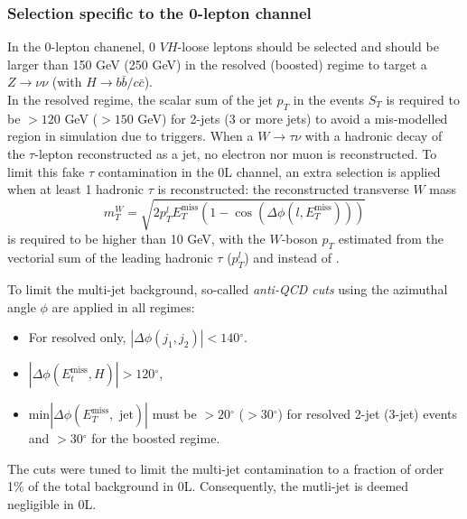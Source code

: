 \subsubsection{Selection specific to the 0-lepton channel}\label{subsubsec-0Lsel}
In the 0-lepton chanenel, 0 $VH$-loose leptons should be selected and \etm should be larger than 150 GeV (250 GeV) in the resolved (boosted) regime to target a $Z \rightarrow \nu\nu$ (with $H \rightarrow b\bar{b}/c\bar{c}$). \\ %

In the resolved regime, the scalar sum of the jet $p_T$ in the events $S_T$ is required to be $> 120$ GeV ($> 150$ GeV) for 2-jets (3 or more jets) to avoid a mis-modelled region in simulation due to triggers. When a $W \rightarrow \tau \nu$ with a hadronic decay of the $\tau$-lepton reconstructed as a jet, no electron nor muon is reconstructed. To limit this fake $\tau$ contamination in the 0L channel, an extra selection is applied when at least 1 hadronic $\tau$ is reconstructed: the reconstructed transverse $W$ mass \[ m_T^W = \sqrt{2 p_T^l E_T^{\textrm{miss}} (1 - \cos(\Delta \phi(l, E_T^{\textrm{miss}} ) ) ) } \] is required to be higher than 10 GeV, with the $W$-boson $p_T$ estimated from the vectorial sum of the leading hadronic $\tau$ ($p_T^l$) and \etm instead of \ptv.

To limit the multi-jet background, so-called \textit{anti-QCD cuts} using the azimuthal angle $\phi$ are applied in all regimes:
\begin{itemize}
    \item For resolved only, $|\Delta \phi(j_1, j_2)| < 140 \ensuremath{^\circ}$.
    \item $|\Delta \phi(E_t^{\textrm{miss}}, H)| > 120 \ensuremath{^\circ}$,
    \item $\textrm{min}|\Delta \phi (E_T^{\textrm{miss}}, \textrm{ jet})|$ must be $> 20\ensuremath{^\circ}$ ($> 30 \ensuremath{^\circ}$) for resolved 2-jet (3-jet) events and $> 30\ensuremath{^\circ}$ for the boosted regime.
\end{itemize}
The cuts were tuned to limit the multi-jet contamination to a fraction of order 1\% of the total background in 0L. Consequently, the mutli-jet is deemed negligible in 0L. 


